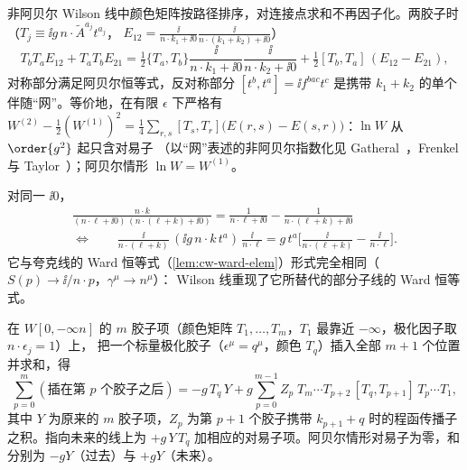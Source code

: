 \begin{remark}\label{rem:cw-nonabelian}
非阿贝尔 Wilson 线中颜色矩阵按路径排序，对连接点求和不再因子化。两胶子时（$T_j\equiv\ii g\,n\cdot\tilde A^{a_j}t^{a_j}$，
$E_{12}=\frac{\ii}{n\cdot k_1+\ii0}\frac{\ii}{n\cdot(k_1+k_2)+\ii0}$）
\begin{equation}\label{eq:cw-nonab2}
T_bT_aE_{12}+T_aT_bE_{21}=\tfrac12\{T_a,T_b\}\frac{\ii}{n\cdot k_1+\ii0}\frac{\ii}{n\cdot k_2+\ii0}
+\tfrac12[T_b,T_a]\,(E_{12}-E_{21}),
\end{equation}
对称部分满足阿贝尔恒等式，反对称部分 $[t^b,t^a]=\ii f^{bac}t^c$ 是携带 $k_1+k_2$ 的单个伴随“网”。等价地，在有限 $\epsilon$ 下严格有
$W^{(2)}-\frac12(W^{(1)})^2=\frac14\sum_{r,s}[T_s,T_r]\big(E(r,s)-E(s,r)\big)$：$\ln W$ 从 $\order{g^2}$ 起只含对易子
（以“网”表述的非阿贝尔指数化见 Gatheral~\cite{Gatheral1983}，Frenkel 与 Taylor~\cite{FrenkelTaylor1984}）；阿贝尔情形 $\ln W=W^{(1)}$。
\end{remark}

\begin{lemma}\tagR\label{lem:cw-eikward}
对同一 $\ii0$，
\begin{equation}\label{eq:cw-eikward}
\begin{gathered}
\frac{n\cdot k}{(n\cdot\ell+\ii0)\,(n\cdot(\ell+k)+\ii0)}=\frac{1}{n\cdot\ell+\ii0}-\frac{1}{n\cdot(\ell+k)+\ii0}\\
\Longleftrightarrow\qquad
\frac{\ii}{n\cdot(\ell+k)}\,(\ii g\,n\cdot k\,t^a)\,\frac{\ii}{n\cdot\ell}=g\,t^a\Big[\frac{\ii}{n\cdot(\ell+k)}-\frac{\ii}{n\cdot\ell}\Big].
\end{gathered}
\end{equation}
它与夸克线的 Ward 恒等式（\cref{lem:cw-ward-elem}）形式完全相同（$S(p)\to\ii/n\cdot p$，$\gamma^\mu\to n^\mu$）：
Wilson 线重现了它所替代的部分子线的 Ward 恒等式。
\end{lemma}

\begin{proposition}\tagR\label{prop:cw-wilson-ward}
在 $W[0,-\infty n]$ 的 $m$ 胶子项（颜色矩阵 $T_1,\dots,T_m$，$T_1$ 最靠近 $-\infty$，极化因子取 $n\cdot\epsilon_j=1$）上，
把一个标量极化胶子（$\epsilon^\mu=q^\mu$，颜色 $T_q$）插入全部 $m+1$ 个位置并求和，得
\begin{equation}\label{eq:cw-wilson-ward}
\sum_{p=0}^{m}(\text{插在第 }p\text{ 个胶子之后})=-g\,T_q\,Y+g\sum_{p=0}^{m-1}Z_p\;T_m\cdots T_{p+2}\,[T_q,T_{p+1}]\,T_p\cdots T_1 ,
\end{equation}
其中 $Y$ 为原来的 $m$ 胶子项，$Z_p$ 为第 $p+1$ 个胶子携带 $k_{p+1}+q$ 时的程函传播子之积。指向未来的线上为
$+g\,Y\,T_q$ 加相应的对易子项。阿贝尔情形对易子为零，和分别为 $-gY$（过去）与 $+gY$（未来）。
\end{proposition}

